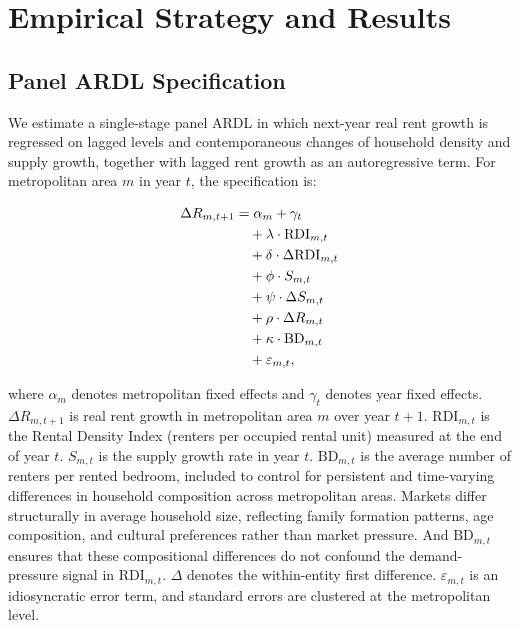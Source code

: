 \documentclass[pdflatex,sn-apa]{sn-jnl}%
\theoremstyle{thmstyleone}%
\theoremstyle{thmstyletwo}%
\theoremstyle{thmstylethree}%
\begin{document}
\section{Empirical Strategy and Results}\label{section4}
\subsection{Panel ARDL Specification}\label{ardl_specification}

We estimate a single-stage panel ARDL in which next-year real rent growth is 
regressed on lagged levels and contemporaneous changes of household density and 
supply growth, together with lagged rent growth as an autoregressive term. For 
metropolitan area $m$ in year $t$, the specification is:

\begin{align}
\Delta R_{m,t+1} &= \alpha_m + \gamma_t \notag \\
&\quad + \lambda \cdot \text{RDI}_{m,t} \notag \\
&\quad + \delta \cdot \Delta\text{RDI}_{m,t} \notag \\
&\quad + \phi \cdot S_{m,t} \notag \\
&\quad + \psi \cdot \Delta S_{m,t} \notag \\
&\quad + \rho \cdot \Delta R_{m,t} \notag \\
&\quad + \kappa \cdot \text{BD}_{m,t} \notag \\
&\quad + \varepsilon_{m,t},
\end{align}

where $\alpha_m$ denotes metropolitan fixed effects and $\gamma_t$ denotes year
fixed effects. $\Delta R_{m,t+1}$ is real rent growth in metropolitan area $m$
over year $t+1$. $\text{RDI}_{m,t}$ is the Rental Density Index (renters per
occupied rental unit) measured at the end of year $t$. $S_{m,t}$ is the supply
growth rate in year $t$. $\text{BD}_{m,t}$ is the average number of renters per
rented bedroom, included to control for persistent and time-varying differences
in household composition across metropolitan areas. Markets differ structurally
in average household size, reflecting family formation patterns, age composition,
and cultural preferences rather than market pressure. And $\text{BD}_{m,t}$
ensures that these compositional differences do not confound the demand-pressure
signal in $\text{RDI}_{m,t}$. $\Delta$ denotes the within-entity first difference.
$\varepsilon_{m,t}$ is an idiosyncratic error term, and standard errors are
clustered at the metropolitan level.
\end{document}
